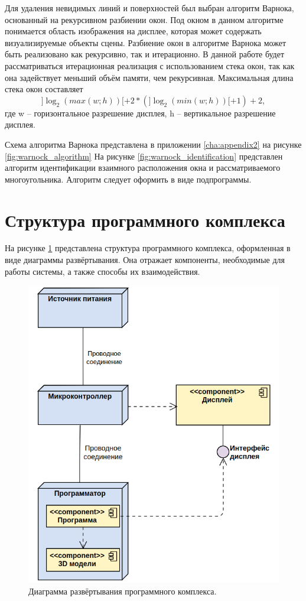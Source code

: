 Для удаления невидимых линий и поверхностей был выбран алгоритм Варнока, основанный на рекурсивном разбиении окон. Под окном в данном алгоритме понимается область изображения на дисплее, которая может содержать визуализируемые объекты сцены. Разбиение окон в алгоритме Варнока может быть реализовано как рекурсивно, так и итерационно. В данной работе будет рассматриваться итерационная реализация с использованием стека окон, так как она задействует меньший объём памяти, чем рекурсивная. Максимальная длина стека окон составляет
\begin{equation}
]\log_{2} (max(w; h))[ + 2 * (]\log_{2} (min(w; h))[ + 1) + 2,
\label{F:F1}
\end{equation}
где w – горизонтальное разрешение дисплея, h – вертикальное разрешение дисплея.

Схема алгоритма Варнока представлена в приложении \ref{cha:appendix2} на рисунке \ref{fig:warnock_algorithm} На рисунке \ref{fig:warnock_identification} представлен алгоритм идентификации взаимного расположения окна и рассматриваемого многоугольника. Алгоритм следует оформить в виде подпрограммы.

\section{Структура программного комплекса}
На рисунке \ref{fig:deploy_diagram} представлена структура программного комплекса, оформленная в виде диаграммы развёртывания. Она отражает компоненты, необходимые для работы системы, а также способы их взаимодействия.

\begin{figure}[h]
	\centering
	\includegraphics[scale=0.777 ]{img/deploy_diagram/dd1.png}
	\caption{Диаграмма развёртывания программного комплекса.}
	\label{fig:deploy_diagram}
\end{figure} 

